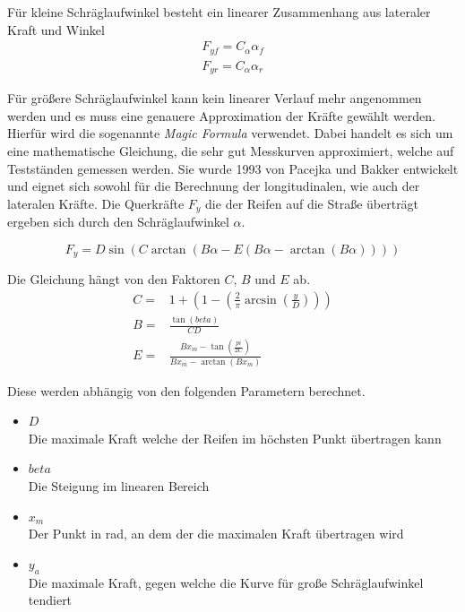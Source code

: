 \documentclass{like}
\begin{document}
Für kleine Schräglaufwinkel besteht ein linearer Zusammenhang aus lateraler Kraft und Winkel
\begin{eqnarray}
F_{yf} = C_\alpha \alpha_f \\
F_{yr} = C_\alpha \alpha_r
\end{eqnarray}

Für größere Schräglaufwinkel kann kein linearer Verlauf mehr angenommen werden und es muss eine genauere Approximation der Kräfte gewählt werden. Hierfür wird die sogenannte \textit{Magic Formula}  \cite{magicFormula} verwendet. Dabei handelt es sich um eine mathematische Gleichung, die sehr gut Messkurven approximiert, welche auf Testständen gemessen werden.
Sie wurde 1993 von Pacejka und Bakker entwickelt und eignet sich sowohl für die Berechnung der longitudinalen, wie auch der lateralen Kräfte. 
Die Querkräfte $F_y$ die der Reifen auf die Straße überträgt ergeben sich durch den Schräglaufwinkel $\alpha$.

\begin{equation}
F_y =  D\sin(C\arctan(B\alpha - E(B\alpha - \arctan(B\alpha))))  \label{eq:magicF} 
\end{equation}

Die Gleichung hängt von den Faktoren \(C\), \(B\) und \(E\) ab. 
\begin{eqnarray}
C =& 1 + \left(1- \left(\frac{2}{\pi} \arcsin \left(\frac{y}{D} \right) \right) \right) \\
B =& \frac{\tan(beta)}{CD} \\
E =& \frac{ B  x_m - \tan \left(\frac{pi}{2 C} \right)}{Bx_m - \arctan(Bx_m)}
\end{eqnarray}


Diese werden abhängig von den folgenden Parametern berechnet.

\begin{itemize}
	\item $D$ \\	
	Die maximale Kraft welche der Reifen im höchsten Punkt übertragen kann
	\item $beta$\\
	Die Steigung im linearen Bereich 
	\item $x_m$ \\
	Der Punkt in rad, an dem der die maximalen Kraft übertragen wird
	\item $y_a$ \\
	Die maximale Kraft, gegen welche die Kurve für große Schräglaufwinkel tendiert 
\end{itemize}
\end{document}
